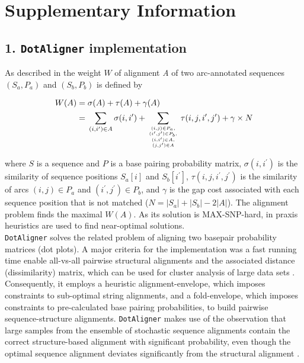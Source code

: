 \documentclass[a4paper,11pt]{article}
\newcommand\dotaligner{\texttt{DotAligner}}
\begin{document}
\newpage 
\section*{ Supplementary Information }

\subsection*{ 1. \dotaligner{} implementation }
\noindent As described in \cite{Palu2010} the weight $W$ of alignment \emph{A}
of two arc-annotated sequences $(S_a,P_a)$ and $(S_b,P_b)$ is defined by

\begin{equation}\label{eq1}
\begin{aligned}
	W(A) ={} & \sigma(A) + \tau(A) + \gamma(A) \\
	     ={} & \sum_{(i,i^\prime) \in A} \sigma(i,i^\prime) + \sum_{(i,j) \in
	P_a,\atop {(i^\prime,j^\prime) \in P_b,\atop {(i,i^\prime) \in
	A,\atop (j,j^\prime) \in A}}} \tau(i,j,i^\prime,j^\prime) + \gamma
	\times N
\end{aligned}
\end{equation}

\noindent where $S$ is a sequence and $P$ is a base pairing probability matrix,
$\sigma(i,i^\prime)$ is the similarity of sequence positions $S_a[i]$ and
$S_b[i^\prime]$, $\tau(i,j,i^\prime,j^\prime)$ is the similarity of arcs $(i,j)
\in P_a$ and $(i^\prime,j^\prime) \in P_b$,
and $\gamma$ is the gap cost associated with each sequence position that is not
matched ($N = |S_a|+|S_b|-2|A|$). The alignment problem finds the maximal
$W(A)$. As its solution is MAX-SNP-hard, in praxis heuristics are used to find
near-optimal solutions.\\

\dotaligner{} solves the related problem of aligning two basepair
probability matrices (dot plots). A major criteria for the implementation was a fast
running time enable all-vs-all pairwise structural alignments and the 
associated distance (dissimilarity) matrix, which can be used for 
cluster analysis of large data sets \cite{Will17432929}. Consequently, 
it employs a heuristic alignment-envelope, 
which imposes constraints to sub-optimal string alignments, 
and a fold-envelope, which imposes constraints to pre-calculated base pairing probabilities, 
to build pairwise sequence-structure alignments. 
\dotaligner{} makes use of the observation that large samples from the ensemble 
of stochastic sequence alignments contain the correct structure-based alignment
with significant probability,  even though the optimal
sequence alignment deviates significantly from the structural alignment
\cite{muckstein2002stochastic}. \\
\end{document}
